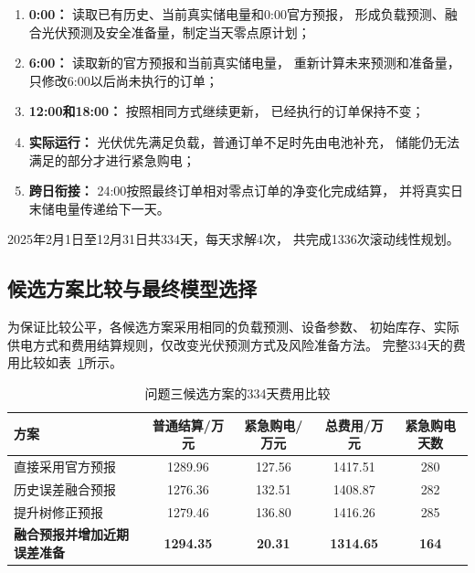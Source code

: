 \begin{enumerate}
    \item \textbf{0:00：}
    读取已有历史、当前真实储电量和0:00官方预报，
    形成负载预测、融合光伏预测及安全准备量，制定当天零点原计划；

    \item \textbf{6:00：}
    读取新的官方预报和当前真实储电量，
    重新计算未来预测和准备量，只修改6:00以后尚未执行的订单；

    \item \textbf{12:00和18:00：}
    按照相同方式继续更新，
    已经执行的订单保持不变；

    \item \textbf{实际运行：}
    光伏优先满足负载，普通订单不足时先由电池补充，
    储能仍无法满足的部分才进行紧急购电；

    \item \textbf{跨日衔接：}
    24:00按照最终订单相对零点订单的净变化完成结算，
    并将真实日末储电量传递给下一天。
\end{enumerate}

2025年2月1日至12月31日共334天，每天求解4次，
共完成1336次滚动线性规划。


\subsection{候选方案比较与最终模型选择}

为保证比较公平，各候选方案采用相同的负载预测、设备参数、
初始库存、实际供电方式和费用结算规则，仅改变光伏预测方式及风险准备方法。
完整334天的费用比较如表~\ref{tab:q3_candidate}所示。

\begin{table}[H]
\centering
\caption{问题三候选方案的334天费用比较}
\label{tab:q3_candidate}
\begin{tabular}{lcccc}
\hline
方案
& 普通结算/万元
& 紧急购电/万元
& 总费用/万元
& 紧急购电天数 \\
\hline
直接采用官方预报
& 1289.96 & 127.56 & 1417.51 & 280 \\

历史误差融合预报
& 1276.36 & 132.51 & 1408.87 & 282 \\

提升树修正预报
& 1279.46 & 136.80 & 1416.26 & 285 \\

\textbf{融合预报并增加近期误差准备}
& \textbf{1294.35}
& \textbf{20.31}
& \textbf{1314.65}
& \textbf{164} \\
\hline
\end{tabular}
\end{table}

